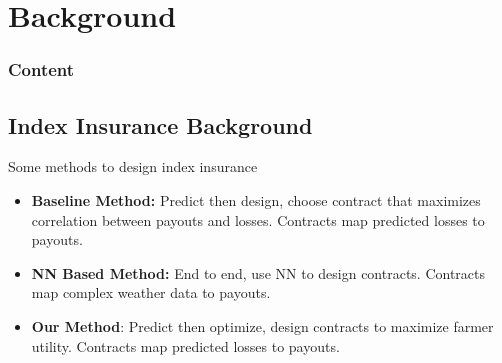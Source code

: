 \documentclass{beamer}
\begin{document}
\section{Background}
\begin{frame}
    \frametitle{Content}
    \tableofcontents[currentsection]
  \end{frame}
\subsection{Index Insurance Background}
\begin{frame}{Some methods to design index insurance}
\begin{itemize}
    \setlength\itemsep{1em}
    \item \textbf{Baseline Method:} Predict then design, choose contract that maximizes correlation between payouts and losses. Contracts map predicted losses to payouts. \cite{chantarat2013designing} 
    \item \textbf{NN Based Method:} End to end, use NN to design contracts. Contracts map complex weather data to payouts. \cite{chen2023managing}
    \item \textbf{Our Method}: Predict then optimize, design contracts to maximize farmer utility. Contracts map predicted losses to payouts.
\end{itemize}
\end{frame} 

\end{document}
